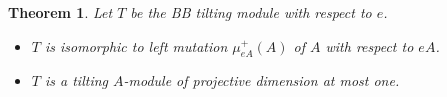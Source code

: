 \documentclass[a4paper,reqno]{amsart}
\newtheorem{theorem}{Theorem}[section]
\newtheorem{lemma}[theorem]{Lemma}
\theoremstyle{definition}
\newcommand{\Hom}{\operatorname{Hom}\nolimits}
\newcommand{\modu}[1]{{\rm{mod}}\text{-}#1} %
\newcommand{\proj}[1]{{\rm{proj}}\text{-}#1} %
\newcommand{\K}{\mathsf{K}}
\newcommand{\D}{\mathsf{D}}
\begin{document}
\begin{theorem}\label{prop:APR is APR}
Let $T$ be the BB tilting module with respect to $e$.
\begin{itemize}
\item[(a)] $T$ is isomorphic to left mutation $\mu_{eA}^+(A)$ of $A$ with respect to $eA$.
\item[(b)] $T$ is a tilting $A$-module of projective dimension at most one.
\end{itemize}
\end{theorem}


\end{document}
